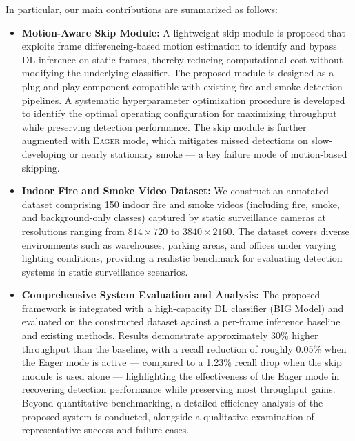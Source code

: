 \documentclass[
  10pt,
]{article}
\begin{document}
In particular, our main contributions are summarized as follows:

\begin{itemize}
\item
  \textbf{Motion-Aware Skip Module:} A lightweight skip module is
  proposed that exploits frame differencing-based motion estimation to
  identify and bypass DL inference on static frames, thereby reducing
  computational cost without modifying the underlying classifier. The
  proposed module is designed as a plug-and-play component compatible
  with existing fire and smoke detection pipelines. A systematic
  hyperparameter optimization procedure is developed to identify the
  optimal operating configuration for maximizing throughput while
  preserving detection performance. The skip module is further augmented
  with \textsc{Eager} mode, which mitigates missed detections on
  slow-developing or nearly stationary smoke --- a key failure mode of
  motion-based skipping.
\item
  \textbf{Indoor Fire and Smoke Video Dataset:} We construct an
  annotated dataset comprising 150 indoor fire and smoke videos
  (including fire, smoke, and background-only classes) captured by
  static surveillance cameras at resolutions ranging from
  \(814 \times 720\) to \(3840 \times 2160\). The dataset covers diverse
  environments such as warehouses, parking areas, and offices under
  varying lighting conditions, providing a realistic benchmark for
  evaluating detection systems in static surveillance scenarios.
\item
  \textbf{Comprehensive System Evaluation and Analysis:} The proposed
  framework is integrated with a high-capacity DL classifier (BIG Model)
  and evaluated on the constructed dataset against a per-frame inference
  baseline and existing methods. Results demonstrate approximately 30\%
  higher throughput than the baseline, with a recall reduction of
  roughly 0.05\% when the Eager mode is active --- compared to a 1.23\%
  recall drop when the skip module is used alone --- highlighting the
  effectiveness of the Eager mode in recovering detection performance
  while preserving most throughput gains. Beyond quantitative
  benchmarking, a detailed efficiency analysis of the proposed system is
  conducted, alongside a qualitative examination of representative
  success and failure cases.
\end{itemize}
\end{document}
